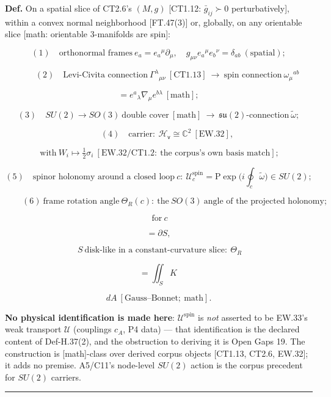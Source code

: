 \begin{definition}\label{tag:Def-H-21}
\textbf{Def.} On a spatial slice of CT2.6's $(M,g)$ [CT1.12: $\bar g_{ij}\succ0$ perturbatively], within a convex normal neighborhood [FT.47(3)] or, globally, on any orientable slice [math: orientable 3-manifolds are spin]:

\[
(1)\quad\text{orthonormal frames}\ e_a=e_a{}^\mu\partial_\mu,\quad g_{\mu\nu}e_a{}^\mu e_b{}^\nu=\delta_{ab}\ (\text{spatial});
\]

\[
\qquad (2)\quad\text{Levi-Civita connection}\ \Gamma^\lambda{}_{\mu\nu}\ [\mathrm{CT1.13}]\ \to\ \text{spin connection}\ \omega_\mu{}^{ab}
\]

\[
= e^a{}_\lambda\nabla_\mu e^{b\lambda}\ [\text{math}];
\]

\[
(3)\quad SU(2)\to SO(3)\ \text{double cover}\ [\text{math}]\ \to\ \mathfrak{su}(2)\text{-connection}\ \tilde\omega;
\]

\[
\qquad (4)\quad\text{carrier}:\ \mathcal H_{\mathsf v}\cong\mathbb C^2\ [\mathrm{EW.32}],
\]

\[
\ \text{with}\ W_i\mapsto\tfrac12\sigma_i\ [\mathrm{EW.32}/\mathrm{CT1.2}:\ \text{the corpus's own basis match}];
\]

\[
(5)\quad\text{spinor holonomy around a closed loop}\ c:\ \mathcal U^{\mathrm{spin}}_c=\mathrm P\exp\bigl(i\!\oint_c\tilde\omega\bigr)\in SU(2);
\]

\[
\qquad (6)\ \text{frame rotation angle}\ \Theta_R(c):\ \text{the}\ SO(3)\ \text{angle of the projected holonomy};
\]

\[
\ \text{for}\ c
\]

\[
= \partial S,
\]

\[
\ S\ \text{disk-like in a constant-curvature slice}:\ \Theta_R
\]

\[
= \iint_S K\,
\]

\[
dA\ [\text{Gauss–Bonnet};\ \text{math}].
\]

\textbf{No physical identification is made here}: $\mathcal U^{\mathrm{spin}}$ is \textit{not} asserted to be EW.33's weak transport $\mathcal U$ (couplings $c_A$, P4 data) — that identification is the declared content of Def-H.37(2), and the obstruction to deriving it is Open Gaps 19. The construction is [math]-class over derived corpus objects [CT1.13, CT2.6, EW.32]; it adds no premise. A5/C11's node-level $SU(2)$ action is the corpus precedent for $SU(2)$ carriers.

\vspace{2pt}\noindent\rule{\textwidth}{0.4pt}\vspace{2pt}

\end{definition}

